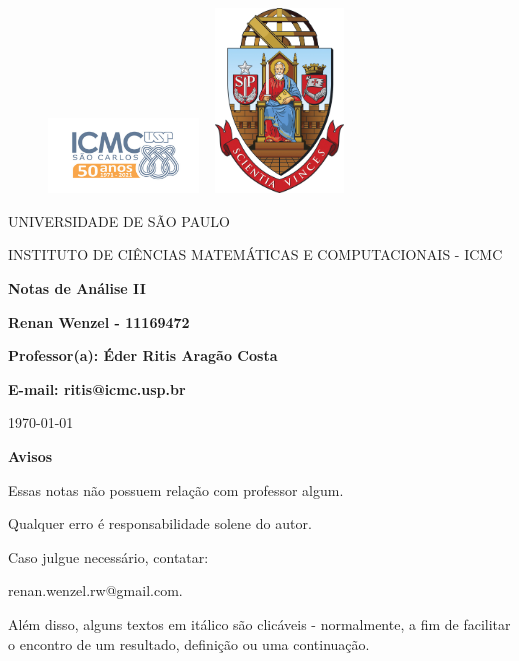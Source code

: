 \documentclass[12pt]{article}
\theoremstyle{definition}
\begin{document}
\begin{figure}[ht]
	\includegraphics[width=4cm]{../icmc.png}
	\hspace{7cm}
	\includegraphics[height=4.9cm,width=4cm]{../brasao_usp_cor.jpg}
	\endminipage
\end{figure}

\begin{center}
	\vspace{1cm}
	\LARGE
	UNIVERSIDADE DE SÃO PAULO

	\vspace{1.3cm}
	\LARGE
	INSTITUTO DE CIÊNCIAS MATEMÁTICAS E COMPUTACIONAIS - ICMC

	\vspace{1.7cm}
	\Large
	\textbf{Notas de Análise II}

	\vspace{1.3cm}
	\large
	\textbf{Renan Wenzel - 11169472}

	\vspace{1.3cm}
	\large
	\textbf{Professor(a): Éder Ritis Aragão Costa}

	\textbf{E-mail: ritis@icmc.usp.br}

	\vspace{1.3cm}
	\today
\end{center}

\newpage
\textbf{{\Huge Avisos}}

{\huge Essas notas não possuem relação com professor algum.

	Qualquer erro é responsabilidade solene do autor.

	Caso julgue necessário, contatar:

	renan.wenzel.rw@gmail.com.

	Além disso, alguns textos em itálico são clicáveis - normalmente, a fim de facilitar o encontro de um resultado, definição ou uma continuação.
}
\end{document}
